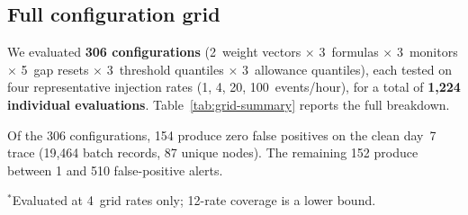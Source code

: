 \documentclass[10pt,twocolumn]{article}
\begin{document}
\subsection{Full configuration grid}
\label{sec:grid}

We evaluated \textbf{306 configurations} (2~weight vectors $\times$
3~formulas $\times$ 3~monitors $\times$ 5~gap resets $\times$ 3~threshold
quantiles $\times$ 3~allowance quantiles), each tested on four representative
injection rates (1, 4, 20, 100~events/hour), for a total of
\textbf{1,224 individual evaluations}.  Table~\ref{tab:grid-summary}
reports the full breakdown.

Of the 306 configurations, 154 produce zero false positives on the
clean day~7 trace (19,464 batch records, 87 unique nodes).  The remaining
152 produce between 1 and 510 false-positive alerts.

\begin{table}[htbp]
\centering
\caption{Strategy ranking by detection coverage across all 12~attack rates
(1--100~events/hr).  The winning configuration was evaluated at all
12~rates; other strategies were screened during the 4-rate grid sweep
(rates~1, 4, 20, 100) and their 12-rate coverage is a conservative lower
bound ($\geq$).  All listed strategies produce zero false positives on the
out-of-sample clean trace unless noted.}
\label{tab:grid-summary}

\smallskip
{\footnotesize $^*$Evaluated at 4~grid rates only;
12-rate coverage is a lower bound.}
\end{table}
\end{document}
